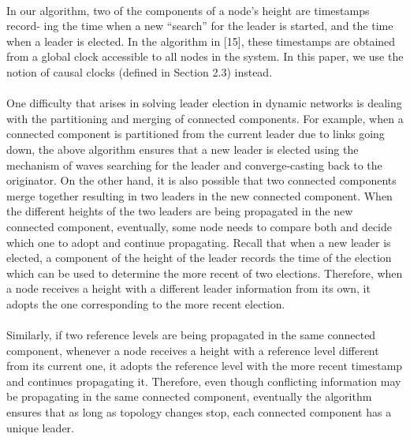 \paragraph{}In our algorithm, two of the components of a node’s height are timestamps record- ing the time when a new “search” for the leader is started, and the time when a leader is elected. In the algorithm in [15], these timestamps are obtained from a global clock accessible to all nodes in the system. In this paper, we use the notion of causal clocks (defined in Section 2.3) instead.
\paragraph{}One difficulty that arises in solving leader election in dynamic networks is dealing with the partitioning and merging of connected components. For example, when a connected component is partitioned from the current leader due to links going down, the above algorithm ensures that a new leader is elected using the mechanism of waves searching for the leader and converge-casting back to the originator. On the other hand, it is also possible that two connected components merge together resulting in two leaders in the new connected component. When the different heights of the two leaders are being propagated in the new connected component, eventually, some node needs to compare both and decide which one to adopt and continue propagating. Recall that when a new leader is elected, a component of the height of the leader records the time of the election which can be used to determine the more recent of two elections. Therefore, when a node receives a height with a different leader information from its own, it adopts the one corresponding to the more recent election.
\paragraph{}Similarly, if two reference levels are being propagated in the same connected component, whenever a node receives a height with a reference level different from its current one, it adopts the reference level with the more recent timestamp and continues propagating it. Therefore, even though conflicting information may be propagating in the same connected component, eventually the algorithm ensures that as long as topology changes stop, each connected component has a unique leader.
\paragraph{}
